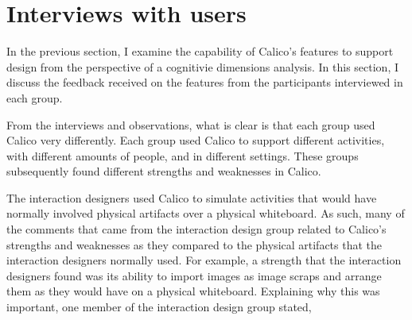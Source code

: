 
\section{Interviews with users}
\label{discussion:interviews}



%

In the previous section, I examine the capability of Calico's features to support design from the perspective of a cognitivie dimensions analysis. In this section, I discuss the feedback received on the features from the participants interviewed in each group.

From the interviews and observations, what is clear is that each group used Calico very differently. Each group used Calico to support different activities, with different amounts of people, and in different settings. These groups subsequently found different strengths and weaknesses in Calico.

The interaction designers used Calico to simulate activities that would have normally involved physical artifacts over a physical whiteboard. As such, many of the comments that came from the interaction design group related to Calico's strengths and weaknesses as they compared to the physical artifacts that the interaction designers normally used. For example, a strength that the interaction designers found was its ability to import images as image scraps and arrange them as they would have on a physical whiteboard. Explaining why this was important, one member of the interaction design group stated, 

